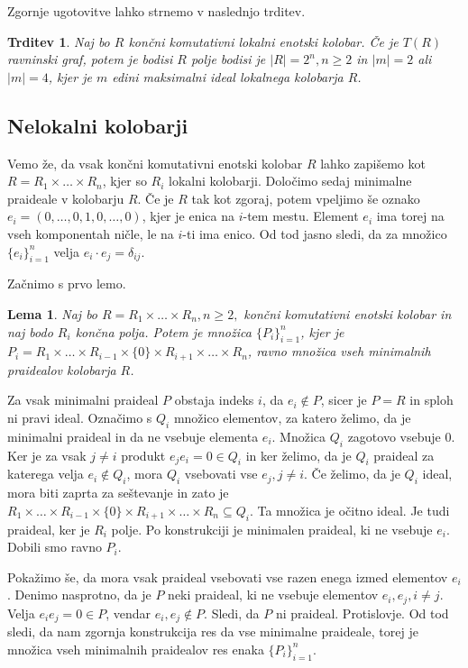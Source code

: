 \documentclass[a4paper, 12pt]{amsart}
\theoremstyle{definition} %
\theoremstyle{plain} %
\newtheorem{lema}[definicija]{Lema}
\newtheorem{trditev}[definicija]{Trditev}
\begin{document}
Zgornje ugotovitve lahko strnemo v naslednjo trditev.

\begin{trditev}
Naj bo $R$ končni komutativni lokalni enotski kolobar. Če je $T(R)$ ravninski graf, potem je bodisi $R$ polje bodisi je $|R| = 2^n, n\ge 2$ in $|m| = 2$ ali $|m| = 4$, kjer je $m$ edini maksimalni ideal lokalnega kolobarja $R$.
\end{trditev}

\subsection{Nelokalni kolobarji}

Vemo že, da vsak končni komutativni enotski kolobar $R$ lahko zapišemo kot $R= R_1 \times \dots \times R_n$, kjer so $R_i$ lokalni kolobarji. Določimo sedaj minimalne praideale v kolobarju $R$. Če je $R$ tak kot zgoraj, potem vpeljimo še oznako $e_i = (0,\dots,0,1,0,\dots,0)$, kjer je enica na $i$-tem mestu. Element $e_i$ ima torej na vseh komponentah ničle, le na $i$-ti ima enico. Od tod jasno sledi, da za množico $\{e_i\}_{i=1}^n$ velja $e_i \cdot e_j = \delta_{ij}$.

Začnimo s prvo lemo. 
\begin{lema}
\label{minPra1}
Naj bo $R=R_1 \times \dots \times R_n, n\ge 2,$ končni komutativni enotski kolobar in naj bodo $R_i$ končna polja. Potem je množica $\{P_i\}_{i=1}^n$, kjer je $P_i = R_1 \times \dots \times R_{i-1} \times \{0\} \times R_{i+1} \times \dots \times R_n$, ravno množica vseh minimalnih praidealov kolobarja $R$.
\end{lema}

\proof
Za vsak minimalni praideal $P$ obstaja indeks $i$, da $e_i\notin P$, sicer je $P = R$ in sploh ni pravi ideal. Označimo s $Q_i$ množico elementov, za katero želimo, da je minimalni praideal in da ne vsebuje elementa $e_i$. Množica $Q_i$ zagotovo vsebuje $0$. Ker je za vsak $j\neq i$ produkt $e_j e_i = 0\in Q_i$ in ker želimo, da je $Q_i$ praideal za katerega velja $e_i \notin Q_i$, mora $Q_i$ vsebovati vse $e_j, j\neq i$. Če želimo, da je $Q_i$ ideal, mora biti zaprta za seštevanje in zato je $ R_1 \times \dots \times R_{i-1} \times \{0\} \times R_{i+1} \times \dots \times R_n \subseteq Q_i$. Ta množica je očitno ideal. Je tudi praideal, ker je $R_i$ polje. Po konstrukciji je minimalen praideal, ki ne vsebuje $e_i$. Dobili smo ravno $P_i$.

Pokažimo še, da mora vsak praideal vsebovati vse razen enega izmed elementov $e_i$. Denimo nasprotno, da je $P$ neki praideal, ki ne vsebuje elementov $e_i,e_j, i\neq j$. Velja $e_i e_j = 0\in P$, vendar $e_i,e_j \notin P$. Sledi, da $P$ ni praideal. Protislovje. 
Od tod sledi, da nam zgornja konstrukcija res da vse minimalne praideale, torej je množica vseh minimalnih praidealov res enaka $\{P_i\}_{i=1}^n$.
\endproof
\end{document}
